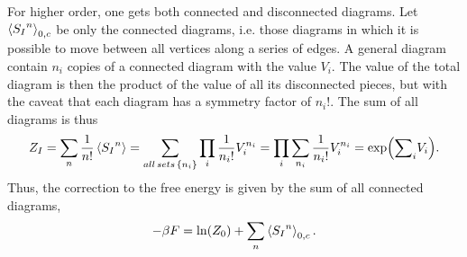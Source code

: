 For higher order, one gets both connected and disconnected diagrams.
Let $\ex{{S_I}^n}_{0, c}$ be only the connected diagrams, i.e. those diagrams in which it is possible to move between all vertices along a series of edges.
A general diagram contain $n_i$ copies of a connected diagram with the value $V_i$.
The value of the total diagram is then the product of the value of all its disconnected pieces, but with the caveat that each diagram has a symmetry factor of $n_i!$.
The sum of all diagrams is thus 
\begin{equation}
    Z_I = \sum_n \frac{1}{n!} \ex{{S_I}^n} 
    = \sum_{ all\,sets\,\{n_i\}} \prod_i \frac{1}{n_i!}V_i^{n_i}
    = \prod_i \sum_{n_i} \frac{1}{n_i!}V_i^{n_i} = \exp({\sum}_i V_i).
\end{equation}
Thus, the correction to the free energy is given by the sum of all connected diagrams,
\begin{equation}
    - \beta F = \ln(Z_0) + \sum_n \ex{{S_I}^n}_{0, c}.
\end{equation}




